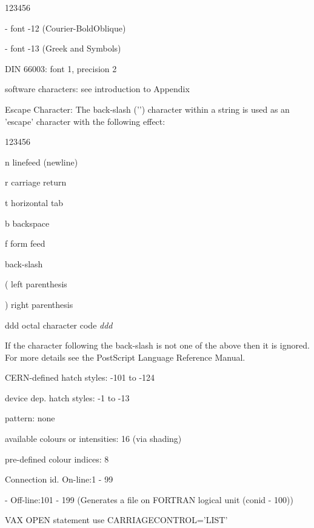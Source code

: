 \begin{DLtt}{123456}
\item[-]font -12 (Courier-BoldOblique)
\item[-]font -13 (Greek and Symbols)
\item[DIN 66003:]font 1, precision 2
\item[software characters:]see introduction to Appendix
\item[Escape Character:]The back-slash ('\bs ') character within
a string is used as an 'escape' character with the following effect:
\begin{DLtt}{123456}
\item[\bs n]linefeed (newline)
\item[\bs r]carriage return
\item[\bs t]horizontal tab
\item[\bs b]backspace
\item[\bs f]form feed
\item[\bs \bs ]back-slash
\item[\bs (]left parenthesis
\item[\bs )]right parenthesis
\item[\bs ddd]octal character code {\it ddd}
\end{DLtt}
If the character following the back-slash is not one of the above
then it is ignored.
For more details see the PostScript Language Reference Manual.
\item[CERN-defined hatch styles:]-101 to -124
\item[device dep. hatch styles:]-1 to -13
\item[pattern:]none
\item[available colours or intensities:]16 (via shading)
\item[pre-defined colour indices:]8
\item[Connection id.]On-line:1 - 99
\item[-]Off-line:101 - 199 (Generates a file on FORTRAN logical unit
(conid - 100))
\item[VAX OPEN statement]use CARRIAGECONTROL='LIST'
\end{DLtt}

